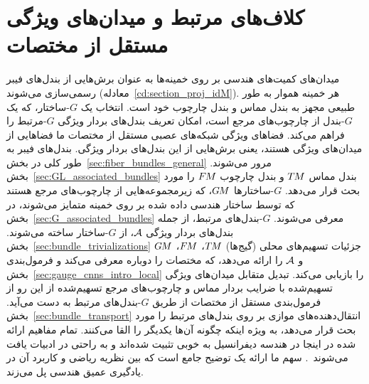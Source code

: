 \section{کلاف‌های مرتبط و میدان‌های ویژگی مستقل از مختصات}
\label{sec:bundles_fields}
میدان‌های کمیت‌های هندسی بر روی خمینه‌ها به عنوان برش‌هایی از بندل‌های فیبر رسمی‌سازی می‌شوند (معادله~\eqref{cd:section_proj_idM}).
هر خمینه هموار به طور طبیعی مجهز به بندل مماس و بندل چارچوب خود است.
انتخاب یک $G$-ساختار، که یک $G$-بندل از چارچوب‌های مرجع است، امکان تعریف بندل‌های بردار ویژگی $G$-مرتبط را فراهم می‌کند.
فضاهای ویژگی شبکه‌های عصبی مستقل از مختصات ما فضاهایی از میدان‌های ویژگی هستند، یعنی برش‌هایی از این بندل‌های بردار ویژگی.
بندل‌های فیبر به طور کلی در بخش~\ref{sec:fiber_bundles_general} مرور می‌شوند.
بخش~\ref{sec:GL_associated_bundles} بندل مماس $T\mkern-1.5muM$ و بندل چارچوب $F\mkern-1.5muM$ را مورد بحث قرار می‌دهد.
$G$-ساختارها $G\mkern-1.4muM$، که زیرمجموعه‌هایی از چارچوب‌های مرجع هستند که توسط ساختار هندسی داده شده بر روی خمینه متمایز می‌شوند، در بخش~\ref{sec:G_associated_bundles} معرفی می‌شوند.
$G$-بندل‌های مرتبط، از جمله بندل‌های بردار ویژگی $\mathcal{A}$، از $G$-ساختار ساخته می‌شوند.
بخش~\ref{sec:bundle_trivializations} جزئیات تسهیم‌های محلی (گیج‌ها) $T\mkern-1.5muM$، $F\mkern-1.5muM$، $G\mkern-1.4muM$ و $\mathcal{A}$ را ارائه می‌دهد، که مختصات را دوباره معرفی می‌کند و فرمول‌بندی بخش~\ref{sec:gauge_cnns_intro_local} را بازیابی می‌کند.
تبدیل متقابل میدان‌های ویژگی تسهیم‌شده با ضرایب بردار مماس و چارچوب‌های مرجع تسهیم‌شده از این رو از فرمول‌بندی مستقل از مختصات از طریق $G$-بندل‌های مرتبط به دست می‌آید.
بخش~\ref{sec:bundle_transport} انتقال‌دهنده‌های موازی بر روی بندل‌های مرتبط را مورد بحث قرار می‌دهد، به ویژه اینکه چگونه آن‌ها یکدیگر را القا می‌کنند.
تمام مفاهیم ارائه شده در اینجا در هندسه دیفرانسیل به خوبی تثبیت شده‌اند و به راحتی در ادبیات یافت می‌شوند~\cite{schullerGeometricalAnatomy2016,nakahara2003geometry,husemollerFibreBundles1994a,steenrodTopologyFibreBundles,shoshichikobayashiFoundationsDifferentialGeometry1963,marshGaugeTheoriesFiber2016,wendlLectureNotesBundles2008,sternberg1999lectures,piccione2006theory,crainic2013GStructuresExamples}.
سهم ما ارائه یک توضیح جامع است که بین نظریه ریاضی و کاربرد آن در یادگیری عمیق هندسی پل می‌زند.